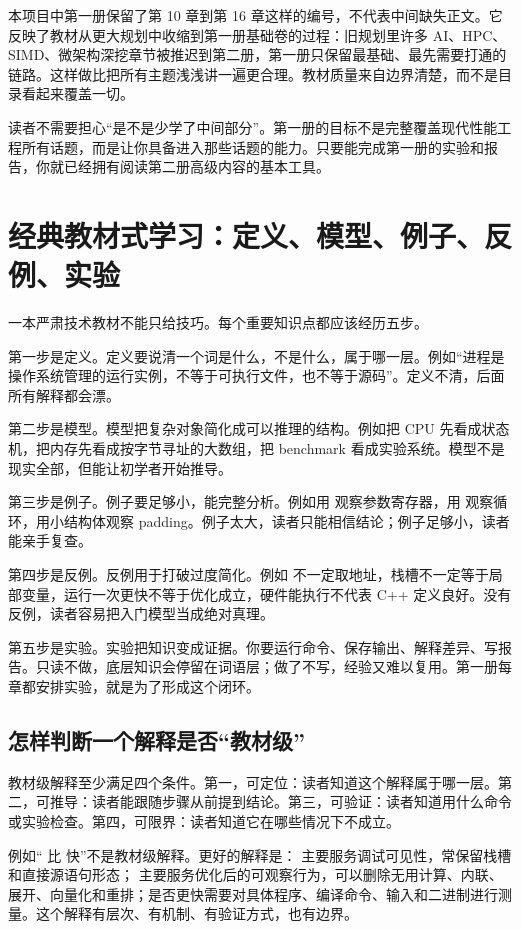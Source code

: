 本项目中第一册保留了第 10 章到第 16 章这样的编号，不代表中间缺失正文。它反映了教材从更大规划中收缩到第一册基础卷的过程：旧规划里许多 AI、HPC、SIMD、微架构深挖章节被推迟到第二册，第一册只保留最基础、最先需要打通的链路。这样做比把所有主题浅浅讲一遍更合理。教材质量来自边界清楚，而不是目录看起来覆盖一切。

读者不需要担心“是不是少学了中间部分”。第一册的目标不是完整覆盖现代性能工程所有话题，而是让你具备进入那些话题的能力。只要能完成第一册的实验和报告，你就已经拥有阅读第二册高级内容的基本工具。

\section{经典教材式学习：定义、模型、例子、反例、实验}

一本严肃技术教材不能只给技巧。每个重要知识点都应该经历五步。

第一步是定义。定义要说清一个词是什么，不是什么，属于哪一层。例如“进程是操作系统管理的运行实例，不等于可执行文件，也不等于源码”。定义不清，后面所有解释都会漂。

第二步是模型。模型把复杂对象简化成可以推理的结构。例如把 CPU 先看成状态机，把内存先看成按字节寻址的大数组，把 benchmark 看成实验系统。模型不是现实全部，但能让初学者开始推导。

第三步是例子。例子要足够小，能完整分析。例如用  观察参数寄存器，用  观察循环，用小结构体观察 padding。例子太大，读者只能相信结论；例子足够小，读者能亲手复查。

第四步是反例。反例用于打破过度简化。例如  不一定取地址，栈槽不一定等于局部变量，运行一次更快不等于优化成立，硬件能执行不代表 C++ 定义良好。没有反例，读者容易把入门模型当成绝对真理。

第五步是实验。实验把知识变成证据。你要运行命令、保存输出、解释差异、写报告。只读不做，底层知识会停留在词语层；做了不写，经验又难以复用。第一册每章都安排实验，就是为了形成这个闭环。

\subsection{怎样判断一个解释是否“教材级”}

教材级解释至少满足四个条件。第一，可定位：读者知道这个解释属于哪一层。第二，可推导：读者能跟随步骤从前提到结论。第三，可验证：读者知道用什么命令或实验检查。第四，可限界：读者知道它在哪些情况下不成立。

例如“ 比  快”不是教材级解释。更好的解释是： 主要服务调试可见性，常保留栈槽和直接源语句形态； 主要服务优化后的可观察行为，可以删除无用计算、内联、展开、向量化和重排；是否更快需要对具体程序、编译命令、输入和二进制进行测量。这个解释有层次、有机制、有验证方式，也有边界。


